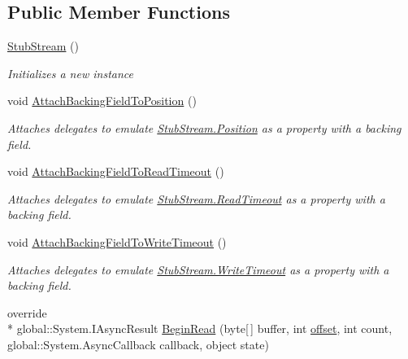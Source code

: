 \subsection*{Public Member Functions}
\begin{DoxyCompactItemize}
\item 
\hyperlink{class_system_1_1_i_o_1_1_fakes_1_1_stub_stream_a1849e551055736c0f71248e999ffce51}{Stub\-Stream} ()
\begin{DoxyCompactList}\small\item\em Initializes a new instance\end{DoxyCompactList}\item 
void \hyperlink{class_system_1_1_i_o_1_1_fakes_1_1_stub_stream_a7095914e889521aef4934aeadeaee96b}{Attach\-Backing\-Field\-To\-Position} ()
\begin{DoxyCompactList}\small\item\em Attaches delegates to emulate \hyperlink{class_system_1_1_i_o_1_1_fakes_1_1_stub_stream_a5b68fff2e0b26047d9e8e87a424a6da7}{Stub\-Stream.\-Position} as a property with a backing field.\end{DoxyCompactList}\item 
void \hyperlink{class_system_1_1_i_o_1_1_fakes_1_1_stub_stream_a625a09bebf0422fc0fa2fe5bffd29861}{Attach\-Backing\-Field\-To\-Read\-Timeout} ()
\begin{DoxyCompactList}\small\item\em Attaches delegates to emulate \hyperlink{class_system_1_1_i_o_1_1_fakes_1_1_stub_stream_ac2ad0a8f43f9e86ae213834d5a7c5a16}{Stub\-Stream.\-Read\-Timeout} as a property with a backing field.\end{DoxyCompactList}\item 
void \hyperlink{class_system_1_1_i_o_1_1_fakes_1_1_stub_stream_a35acd19a6abe47f0d0395ce4b9bd8319}{Attach\-Backing\-Field\-To\-Write\-Timeout} ()
\begin{DoxyCompactList}\small\item\em Attaches delegates to emulate \hyperlink{class_system_1_1_i_o_1_1_fakes_1_1_stub_stream_a323e383a9449ab5bcb90b91b5066055f}{Stub\-Stream.\-Write\-Timeout} as a property with a backing field.\end{DoxyCompactList}\item 
override \\*
global\-::\-System.\-I\-Async\-Result \hyperlink{class_system_1_1_i_o_1_1_fakes_1_1_stub_stream_af81e1bd11e8f8937ac2d3d4b49bdd0a0}{Begin\-Read} (byte\mbox{[}$\,$\mbox{]} buffer, int \hyperlink{jquery-1_810_82_8js_a4a9f594d20d927164551fc7fa4751a2f}{offset}, int count, global\-::\-System.\-Async\-Callback callback, object state)

\end{DoxyCompactItemize}
